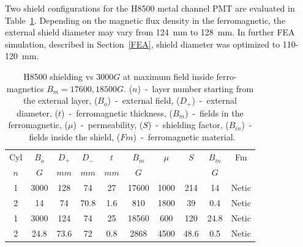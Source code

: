 \documentclass[12pt]{article}
\begin{document}
Two shield  configurations for the H8500 metal channel PMT are evaluated 
 in Table~\ref{H8500at17600}.
Depending on the  magnetic flux density in the  ferromagnetic,
the external shield diameter may vary from  124~mm to 128~mm.  
In further  FEA simulation, described in Section~\ref{FEA},
 shield diameter  was  optimized to  110-120~mm.
%
%
\begin{table}[htbp]
\begin{center}
\begin{tabular}{|c|c|c|c|c|c|c|c|c|c|} \hline
Cyl&$B_{o}$& $D_+$ & $D_-$ & $t$  & $B_m$  & $\mu$   & $S$    &$B_{in}$         & Fm \\
$n$&$G$    & $mm$  & $mm$  & $mm$ & $G$   &         &        &$G$             &       \\ \hline  
1 &3000    &  128  &  74   & 27   &  17600 &  1000   &  214   &  14             & Netic \\
2 &14      &  74   &  70.8 & 1.6  &  810   &  1800   &  39    & 0.4             & Netic  \\ \hline \hline
1&3000     &   124 &  74   & 25   & 18560  & 600     & 120    & 24.8            & Netic \\ 
2&24.8     & 73.6  &  72   & 0.8  & 2868   & 4500    & 48.6   & 0.5             & Netic \\ \hline
\end{tabular}                                                      
\end{center}
\caption{\small{H8500 shielding  vs  $3000G$  at maximum
field inside  ferro-magnetics  $B_m=17600,18500G$.
($n$)~-~layer number starting from the external layer,
($B_{o}$)~-~external field,
($D_+$)~-~external diameter,
($t$)~-~ferromagnetic thickness,%
($B_m$)~-~fields in the ferromagnetic, %
($\mu$)~-~permeability,%
($S$)~-~shielding factor,%
($B_{in}$)~-~fields inside the shield,%
($Fm$)~-~ferromagnetic material.} \label{H8500at17600} }
\end{table}
\end{document}
